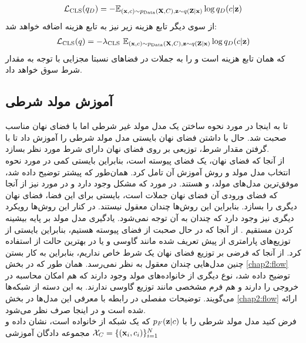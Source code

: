 \begin{align}
    {\mathcal{L}}_\text{CLS} (q_D) = -\mathbb E_{({\bf x}, c) \sim p_\text{Data}({\bf X},C) , {\bf z} \sim q({\bf Z}|{\bf x})} \log q_D(c | {\bf z})
\end{align}
از سوی دیگر تابع هزینه زیر نیز به تابع هزینه \encoder{} اضافه خواهد شد:
\begin{align}
{\mathcal{L}}_\text{CLS} (q) = - \lambda_\text{CLS} ~ \mathbb E_{({\bf x}, c) \sim p_\text{Data}({\bf X},C) , {\bf z} \sim q({\bf Z}|{\bf x})} \log q_D(c | {\bf z})
\end{align}
که همان تابع هزینه \classifier{} است و \encoder{} را به \encode{} جملات در فضاهای نسبتا مجزایی با توجه به مقدار شرط سوق خواهد داد.

\subsection{آموزش مولد شرطی}
تا به اینجا در مورد نحوه ساختن یک مدل مولد غیر شرطی اما با فضای نهان مناسب صحبت شد. حال با داشتن فضای نهان بایستی مدل مولد شرطی را آموزش داد تا با گرفتن مقدار شرط، توزیعی بر روی فضای نهان دارای شرط مورد نظر بسازد.
\\
از آنجا که فضای نهان، یک فضای پیوسته است، بنابراین بایستی کمی در مورد نحوه انتخاب مدل مولد و روش آموزش آن تامل کرد. همان‌طور که پیشتر توضیح داده شد، موفق‌ترین مدل‌های مولد، \gan{} و \vae{} هستند. در مورد \gan{} که مشکل \modecollapse{} وجود دارد و در مورد \vae{} نیز از آنجا که فضای ورودی آن فضای نهان جملات است، بایستی برای این فضا، فضای نهان دیگری را بسازد. بنابراین این روش‌ها چندان معقول نیستند. در کنار این روش‌ها رویکرد دیگری نیز وجود دارد که چندان به آن توجه نمی‌شود. یادگیری مدل مولد بر پایه بیشینه کردن مستقیم \likelihood{}. از آنجا که در حال صحبت از فضای پیوسته هستیم، بنابراین بایستی از توزیع‌های پارامتری از پیش تعریف شده مانند گاوسی و یا در بهترین حالت از
استفاده کرد. از آنجا که فرضی بر توزیع فضای نهان یک شرط خاص نداریم، بنابراین به کار بستن چنین مدل‌هایی چندان معقول به نظر نمی‌رسد. همان طور که در بخش \ref{chap2:flow}‌ توضیح داده شد، نوع دیگری از خانواده‌های مولد وجود دارند که هم امکان محاسبه \likelihood{} در خروجی را دارند و هم فرم مشخصی مانند توزیع گاوسی ندارند. به این دسته از شبکه‌ها \normalizingflownets{} می‌گویند. توضیحات مفصلی در رابطه با معرفی این مدل‌ها در بخش \ref{chap2:flow} ارائه شده است و در اینجا صرف نظر می‌شود.
\\
فرض کنید مدل مولد شرطی را با $p_F({\bf z}|c)$ که یک شبکه از خانواده \normalizingflownets{} است، نشان داده و مجموعه دادگان آموزشی
$\mathcal{X}_C = \{({\bf x}_i, c_i)\}_{i=1}^{N}$
